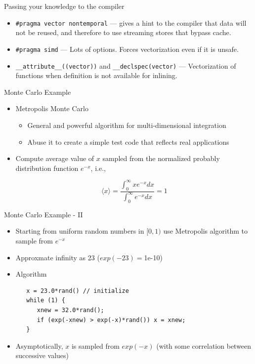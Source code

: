 \begin{frame}[fragile]{Passing your knowledge to the compiler}
  \begin{itemize}
  \item \verb+#pragma vector nontemporal+ --- gives a hint to the compiler that data will not be reused, and therefore to use streaming stores that bypass cache.
  \item \verb+#pragma simd+ --- Lots of options. Forces vectorization even if it is unsafe.
  \item \verb+__attribute__((vector))+ and \verb+__declspec(vector)+ --- Vectorization of functions when definition is not available for inlining.
  \end{itemize}
\end{frame}

\begin{frame}{Monte Carlo Example}

  \begin{itemize}
  \item Metropolis Monte Carlo
    \begin{itemize}
    \item General and powerful algorithm for multi-dimensional integration
    \item Abuse it to create a simple test code that reflects real applications
    \end{itemize}

  \item Compute average value of $x$ sampled from the normalized probably distribution function $e^{-x}$, i.e., 

\[
    \langle x \rangle = \frac{\int_0^{\infty} x e^{-x} dx}{\int_0^{\infty} e^{-x} dx} = 1
\]


  \end{itemize}
\end{frame}

\begin{frame}[fragile]{Monte Carlo Example - II}

  \begin{itemize}
  \item Starting from uniform random numbers in $[0,1)$ use Metropolis
    algorithm to sample from $e^{-x}$
  \item Approxmate infinity as 23 ($exp(-23) =$1e-10)
  \item Algorithm
\begin{verbatim}
   x = 23.0*rand() // initialize
   while (1) {
      xnew = 32.0*rand();
      if (exp(-xnew) > exp(-x)*rand()) x = xnew;
   }
\end{verbatim}
  \item Asymptotically, $x$ is sampled from $exp(-x)$ (with some correlation between successive values)
  \end{itemize}

\end{frame}


